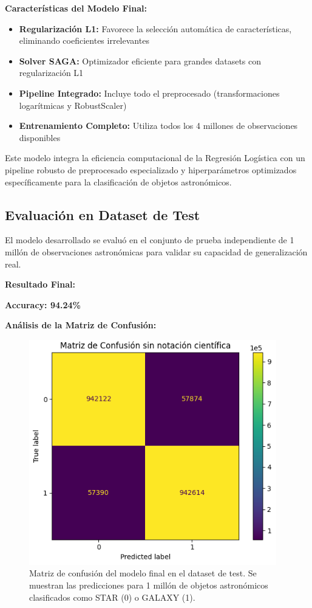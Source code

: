 \documentclass{article}
\begin{document}
\textbf{Características del Modelo Final:}
\begin{itemize}
    \item \textbf{Regularización L1:} Favorece la selección automática de características, eliminando coeficientes irrelevantes
    \item \textbf{Solver SAGA:} Optimizador eficiente para grandes datasets con regularización L1
    \item \textbf{Pipeline Integrado:} Incluye todo el preprocesado (transformaciones logarítmicas y RobustScaler)
    \item \textbf{Entrenamiento Completo:} Utiliza todos los 4 millones de observaciones disponibles
\end{itemize}

Este modelo integra la eficiencia computacional de la Regresión Logística con un pipeline robusto de preprocesado especializado y hiperparámetros optimizados específicamente para la clasificación de objetos astronómicos.

\subsection{Evaluación en Dataset de Test}

El modelo desarrollado se evaluó en el conjunto de prueba independiente de 1 millón de observaciones astronómicas para validar su capacidad de generalización real.

\textbf{Resultado Final:}
\begin{center}
\Large \textbf{Accuracy: 94.24\%}
\end{center}

\textbf{Análisis de la Matriz de Confusión:}

\begin{figure}[H]
    \centering
    \includegraphics[width=0.6\linewidth]{matriz_confusion.png}
    \caption{Matriz de confusión del modelo final en el dataset de test. Se muestran las predicciones para 1 millón de objetos astronómicos clasificados como STAR (0) o GALAXY (1).}
    \label{fig:matriz_confusion}
\end{figure}
\end{document}
